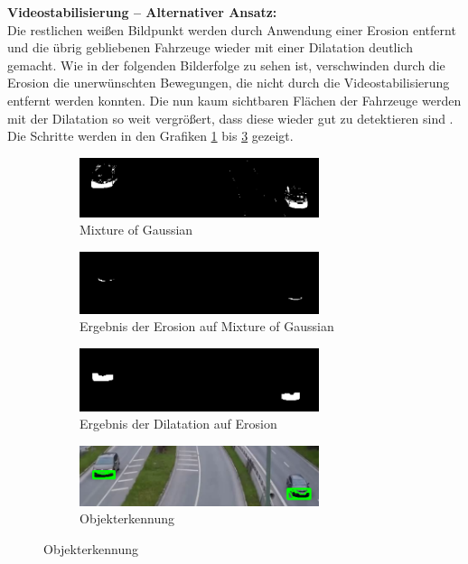 \documentclass[conference]{IEEEtran}
\begin{document}
	\textbf{Videostabilisierung – Alternativer Ansatz:}\\
	Die restlichen weißen Bildpunkt werden durch Anwendung einer Erosion entfernt und die übrig gebliebenen Fahrzeuge wieder mit einer Dilatation deutlich gemacht.
	Wie in der folgenden Bilderfolge zu sehen ist, verschwinden durch die Erosion die unerwünschten Bewegungen, die nicht durch die Videostabilisierung entfernt werden konnten. Die nun kaum sichtbaren Flächen der Fahrzeuge werden mit der Dilatation so weit vergrößert, dass diese wieder gut zu detektieren sind \cite{ed}. Die Schritte werden in den Grafiken \ref{MOGPart1} bis \ref{MOGPart4} gezeigt.\\
	\begin{figure}
		\begin{subfigure}{}
			\centering\includegraphics[width=7cm]{Media/MOG1.png}
			\caption{Mixture of Gaussian}
			\label{MOGPart1}
		\end{subfigure}
		\vspace{5pt}
		\begin{subfigure}{}
			\centering\includegraphics[width=7cm]{Media/MOG2.png}
			\caption{Ergebnis der Erosion auf Mixture of Gaussian}
		\end{subfigure}
		\vspace{5pt}
		\begin{subfigure}{}
			\centering\includegraphics[width=7cm]{Media/MOG3.png}
			\caption{Ergebnis der Dilatation auf Erosion}
		\end{subfigure}
		\vspace{5pt}
		\begin{subfigure}{}
			\centering\includegraphics[width=7cm]{Media/MOG4.png}
			\caption{Objekterkennung}
			\label{MOGPart4}
		\end{subfigure}	
	\end{figure}
	
\end{document}
